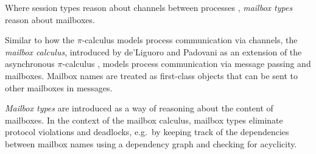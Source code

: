 
Where session types reason about channels between processes \cite{hondaTypesDyadicInteraction1993,wadlerPropositionsSessions2014,kobayashiTypeSystemLockFree2002,huttelFoundationsSessionTypes2016}, \emph{mailbox types} \cite{deliguoroMailboxTypesUnordered2018} reason about mailboxes.

Similar to how the $\pi$-calculus \cite{milnerCalculusMobileProcesses1992} models process communication via channels, the \emph{mailbox calculus},
introduced by de’Liguoro and Padovani as an extension of the asynchronous $\pi$-calculus \cite{amadioBisimulationsAsynchronousPcalculus1998},
models process communication via message passing and mailboxes.
Mailbox names are treated as first-class objects that can be sent to other mailboxes in messages.

\emph{Mailbox types} are introduced as a way of reasoning about the content of mailboxes.
In the context of the mailbox calculus, mailbox types eliminate protocol violations and deadlocks, e.g.\ by keeping track of the dependencies
between mailbox names using a dependency graph and checking for acyclicity.

